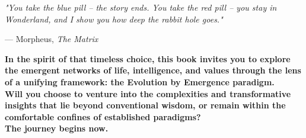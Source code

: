 \thispagestyle{empty} %
\epigraph{
    \textit{"You take the blue pill – the story ends. You take the red pill – you stay in Wonderland, and I show you how deep the rabbit hole goes."}
}{
    --- Morpheus, \textit{The Matrix}
}

\vspace{1cm}

\begin{center}
\textbf{\Large In the spirit of that timeless choice, this book invites you to explore the emergent networks of life, intelligence, and values through the lens of a unifying framework: the Evolution by Emergence paradigm.\\[0.5em] Will you choose to venture into the complexities and transformative insights that lie beyond conventional wisdom, or remain within the comfortable confines of established paradigms?\\[1em] The journey begins now.} %
\end{center}
\cleardoublepage %
